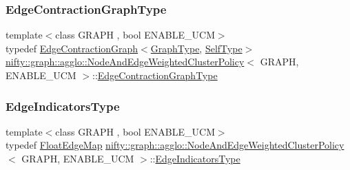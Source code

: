 \subsubsection{\texorpdfstring{Edge\+Contraction\+Graph\+Type}{EdgeContractionGraphType}}
{\footnotesize\ttfamily template$<$class G\+R\+A\+PH , bool E\+N\+A\+B\+L\+E\+\_\+\+U\+CM$>$ \\
typedef \hyperlink{classnifty_1_1graph_1_1EdgeContractionGraph}{Edge\+Contraction\+Graph}$<$\hyperlink{classnifty_1_1graph_1_1agglo_1_1NodeAndEdgeWeightedClusterPolicy_a293d476ffc7b8513eeb20c21bfefb579}{Graph\+Type}, \hyperlink{classnifty_1_1graph_1_1agglo_1_1NodeAndEdgeWeightedClusterPolicy}{Self\+Type}$>$ \hyperlink{classnifty_1_1graph_1_1agglo_1_1NodeAndEdgeWeightedClusterPolicy}{nifty\+::graph\+::agglo\+::\+Node\+And\+Edge\+Weighted\+Cluster\+Policy}$<$ G\+R\+A\+PH, E\+N\+A\+B\+L\+E\+\_\+\+U\+CM $>$\+::\hyperlink{classnifty_1_1graph_1_1agglo_1_1NodeAndEdgeWeightedClusterPolicy_a467e2768e424a998379deedaaebfe9a9}{Edge\+Contraction\+Graph\+Type}}

\mbox{\label{classnifty_1_1graph_1_1agglo_1_1NodeAndEdgeWeightedClusterPolicy_a708c515ae905c01d71d590976fb06ebb}} 
\subsubsection{\texorpdfstring{Edge\+Indicators\+Type}{EdgeIndicatorsType}}
{\footnotesize\ttfamily template$<$class G\+R\+A\+PH , bool E\+N\+A\+B\+L\+E\+\_\+\+U\+CM$>$ \\
typedef \hyperlink{classnifty_1_1graph_1_1agglo_1_1NodeAndEdgeWeightedClusterPolicy_ad96ecbc93cd5424b2d5dd013439820ca}{Float\+Edge\+Map} \hyperlink{classnifty_1_1graph_1_1agglo_1_1NodeAndEdgeWeightedClusterPolicy}{nifty\+::graph\+::agglo\+::\+Node\+And\+Edge\+Weighted\+Cluster\+Policy}$<$ G\+R\+A\+PH, E\+N\+A\+B\+L\+E\+\_\+\+U\+CM $>$\+::\hyperlink{classnifty_1_1graph_1_1agglo_1_1NodeAndEdgeWeightedClusterPolicy_a708c515ae905c01d71d590976fb06ebb}{Edge\+Indicators\+Type}}

